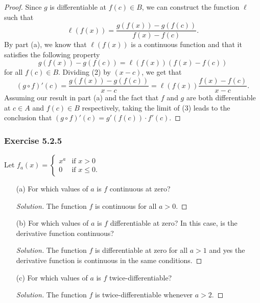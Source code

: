 \begin{enumerate}
\begin{proof}
        Since \( g  \) is differentiable at \( f(c) \in B  \), we can construct the function \( \ell  \) such that 
        \[  \ell(f(x)) = \frac{ g(f(x)) - g(f(c))  }{ f(x) - f(c) } \tag{1}.  \]
        By part (a), we know that \( \ell(f(x))  \) is a continuous function and that it satisfies the following property 
        \[  g(f(x)) - g(f(c)) =  \ell(f(x)) (f(x) - f(c)) \tag{2}  \]
for all \( f(c) \in B  \). Dividing (2) by \( (x-c) \), we get that 
\[ (g \circ f)'(c)= \frac{ g(f(x)) - g(f(c))  }{ x - c   } = \ell(f(x)) \frac{ f(x) - f(c)  }{ x - c  } \tag{3}.  \]
Assuming our result in part (a) and the fact that \( f  \) and \( g  \) are both differentiable at \( c \in A  \) and \( f(c) \in B  \) respectively, taking the limit of (3) leads to 
the conclusion that \( (g \circ f)'(c) = g'(f(c)) \cdot f'(c) \). 
        \end{proof}
\end{enumerate}



\subsubsection{Exercise 5.2.5} Let \( f_a (x) = 
\begin{cases}
    x^a &\text{if } x > 0 \\
    0 &\text{if } x \leq 0. 
\end{cases} \)

\begin{enumerate}
    \item[(a)] For which values of \( a \) is \( f  \) continuous at zero? 
        \begin{proof}[Solution]
        The function \( f \) is continuous for all \( a > 0  \).
        \end{proof}
    \item[(b)] For which values of \( a \) is \( f  \) differentiable at zero? In this case, is the derivative function continuous? 
        \begin{proof}[Solution]
        The function \( f  \) is differentiable at zero for all \( a >  1  \) and yes the derivative function is continuous in the same conditions.
        \end{proof}
    \item[(c)] For which values of \( a  \) is \( f  \) twice-differentiable?
        \begin{proof}[Solution]
        The function \( f  \) is twice-differentiable whenever \( a >  2  \).
        \end{proof}
\end{enumerate}


